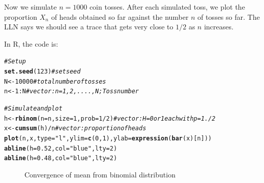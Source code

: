 \documentclass[english,12pt]{book}\usepackage[]{graphicx}\usepackage[]{xcolor}
\makeatletter
\newcommand{\hlnum}[1]{\textcolor[rgb]{0.686,0.059,0.569}{#1}}%
\newcommand{\hlstr}[1]{\textcolor[rgb]{0.192,0.494,0.8}{#1}}%
\newcommand{\hlcom}[1]{\textcolor[rgb]{0.678,0.584,0.686}{\textit{#1}}}%
\newcommand{\hlopt}[1]{\textcolor[rgb]{0,0,0}{#1}}%
\newcommand{\hlstd}[1]{\textcolor[rgb]{0.345,0.345,0.345}{#1}}%
\newcommand{\hlkwb}[1]{\textcolor[rgb]{0.69,0.353,0.396}{#1}}%
\newcommand{\hlkwc}[1]{\textcolor[rgb]{0.333,0.667,0.333}{#1}}%
\newcommand{\hlkwd}[1]{\textcolor[rgb]{0.737,0.353,0.396}{\textbf{#1}}}%
\newenvironment{kframe}{%
 \def\at@end@of@kframe{}%
 \ifinner\ifhmode%
  \def\at@end@of@kframe{\end{minipage}}%
  \begin{minipage}{\columnwidth}%
 \fi\fi%
 \def\FrameCommand##1{\hskip\@totalleftmargin \hskip-\fboxsep
 \colorbox{shadecolor}{##1}\hskip-\fboxsep
     \hskip-\linewidth \hskip-\@totalleftmargin \hskip\columnwidth}%
 \MakeFramed {\advance\hsize-\width
   \@totalleftmargin\z@ \linewidth\hsize
   \@setminipage}}%
 {\par\unskip\endMakeFramed%
 \at@end@of@kframe}
\newenvironment{knitrout}{}{} %
\makeatother
\begin{document}
\begin{example}
Now we simulate $n = 1000$ coin tosses. After each simulated toss, we plot the proportion $X_n$ of heads obtained so far against the number $n$ of tosses so far. The LLN says we should see a trace that gets very close to $1/2$ as $n$ increases.

In R, the code is:

\begin{knitrout}
\color{fgcolor}\begin{kframe}
\begin{alltt}
\hlcom{# Set up}
\hlkwd{set.seed}\hlstd{(}\hlnum{123}\hlstd{)}                            \hlcom{# set seed}
\hlstd{N} \hlkwb{<-} \hlnum{10000}                               \hlcom{# total number of tosses}
\hlstd{n} \hlkwb{<-} \hlnum{1}\hlopt{:}\hlstd{N}                                 \hlcom{# vector: n = 1, 2, ...., N; Toss number}

\hlcom{# Simulate and plot}
\hlstd{h} \hlkwb{<-} \hlkwd{rbinom}\hlstd{(}\hlkwc{n} \hlstd{= n,} \hlkwc{size} \hlstd{=} \hlnum{1}\hlstd{,} \hlkwc{prob} \hlstd{=} \hlnum{1}\hlopt{/}\hlnum{2}\hlstd{)} \hlcom{# vector: H = 0 or 1 each with p = 1./2}
\hlstd{x} \hlkwb{<-} \hlkwd{cumsum}\hlstd{(h)} \hlopt{/} \hlstd{n}                       \hlcom{# vector: proportion of heads}
\hlkwd{plot}\hlstd{(n, x,} \hlkwc{type} \hlstd{=} \hlstr{"l"}\hlstd{,} \hlkwc{ylim} \hlstd{=} \hlkwd{c}\hlstd{(}\hlnum{0}\hlstd{,} \hlnum{1}\hlstd{),} \hlkwc{ylab} \hlstd{=} \hlkwd{expression}\hlstd{(}\hlkwd{bar}\hlstd{(x)[n]))}
\hlkwd{abline}\hlstd{(}\hlkwc{h} \hlstd{=} \hlnum{0.52}\hlstd{,} \hlkwc{col} \hlstd{=} \hlstr{"blue"}\hlstd{,} \hlkwc{lty} \hlstd{=} \hlnum{2}\hlstd{)}
\hlkwd{abline}\hlstd{(}\hlkwc{h} \hlstd{=} \hlnum{0.48}\hlstd{,} \hlkwc{col} \hlstd{=} \hlstr{"blue"}\hlstd{,} \hlkwc{lty} \hlstd{=} \hlnum{2}\hlstd{)}
\end{alltt}
\end{kframe}
\end{knitrout}

\begin{figure}[H]
  \caption{Convergence of mean from binomial distribution}
    \label{fig:CLTbinomial}
     \centering
    \begin{minipage}{.9\linewidth}
\begin{knitrout}
\color{fgcolor}


\end{knitrout}
\end{minipage}
\end{figure}
\end{example}
\end{document}
